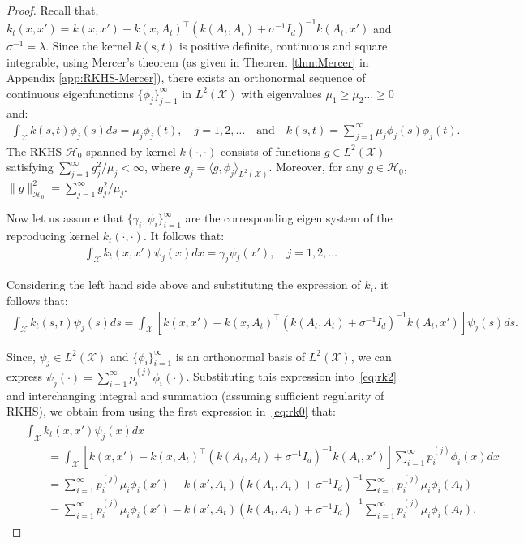 \documentclass[10pt,a4paper]{amsart}
\begin{document}
\begin{proof}
Recall  that, $k_t(x,x')= k(x,x')- k(x,A_t)^\top (k(A_t,A_t)+\sigma^{-1} I_d)^{-1} k(A_t,x')$ and $\sigma^{-1}= \lambda$.  Since the kernel $k(s,t)$ is positive definite, continuous and square integrable, using Mercer's theorem (as given in Theorem \ref{thm:Mercer} in Appendix \ref{app:RKHS-Mercer}), there exists an orthonormal sequence of continuous eigenfunctions $\{\phi_j\}_{j=1}^{\infty}$ in $L^2(\mathcal X)$ with eigenvalues $\mu_1\geq \mu_2\ldots \geq 0$ and:
\begin{align}
    \int_{\mathcal X} k(s,t)\phi_j(s)ds= \mu_j \phi_j(t), \quad j={1,2,\ldots} \quad \text{and} \quad k(s,t)= \sum_{j=1}^{\infty} \mu_j \phi_j(s)\phi_j(t).
    \label{eq:rk0}
\end{align} 
The RKHS $\mathcal H_0$ spanned by kernel $k(\cdot,\cdot)$ consists of functions $g\in L^2(\mathcal X)$ satisfying $\sum_{j=1}^{\infty}{g_j^2}/{\mu_j} < \infty$, where $g_j= \langle g, \phi_j\rangle_{L^2(\mathcal X)}$. Moreover, for any $g\in\mathcal H_0$,  $\|g\|_{\mathcal H_0}^2 = \sum_{j=1}^{\infty}{g_j^2}/{\mu_j}$.

Now let us assume that $\{\gamma_i,\psi_i\}_{i=1}^{\infty}$ are the corresponding eigen system of the reproducing kernel $k_t(\cdot,\cdot)$. It follows that:
\begin{align}
    \int_{\mathcal X} k_t(x,x')\psi_j(x)dx= \gamma_j \psi_j(x'), \quad j={1,2,\ldots}
    \label{eq:rk1}
\end{align}

Considering the left hand side above and substituting the expression of $k_t$, it follows that:
\begin{align}
    \int_{\mathcal X} k_t(s,t)\psi_j(s)ds = \int_{\mathcal X} \left[k(x,x')- k(x,A_t)^\top (k(A_t,A_t)+\sigma^{-1} I_d)^{-1} k(A_t,x')\right]\psi_j(s)ds.
    \label{eq:rk2}
\end{align}

Since, $\psi_j \in L^2(\mathcal X)$ and $\{\phi_i\}_{i=1}^{\infty}$ is an orthonormal basis of $L^2(\mathcal X)$, we can express $\psi_j(\cdot) = \sum_{i=1}^{\infty} p^{(j)}_i  \phi_i(\cdot) $. Substituting this expression into~\eqref{eq:rk2} and interchanging integral and summation (assuming sufficient regularity of RKHS), we obtain from using the first expression in~\eqref{eq:rk0} that:
\begin{align}\label{eq:rk3}
\begin{split}
    &\int_{\mathcal X} k_t(x,x')\psi_j(x)dx\\
    &\qquad = \int_{\mathcal X} \left[k(x,x')- k(x,A_t)^\top (k(A_t,A_t)+\sigma^{-1} I_d)^{-1} k(A_t,x')\right]\sum_{i=1}^{\infty} p^{(j)}_i  \phi_i(x)dx
    \\
    &\qquad = \sum_{i=1}^{\infty} p^{(j)}_i \mu_i \phi_i(x') - k(x', A_t) (k(A_t,A_t)+\sigma^{-1} I_d)^{-1} \sum_{i=1}^{\infty} p^{(j)}_i \mu_i \phi_i(A_t)
    \\
    &\qquad = \sum_{i=1}^{\infty} p^{(j)}_i \mu_i \phi_i(x') - k(x', A_t) (k(A_t,A_t)+\sigma^{-1} I_d)^{-1} \sum_{i=1}^{\infty} p^{(j)}_i \mu_i \phi_i(A_t).
\end{split}
\end{align}


\end{proof}
\end{document}

